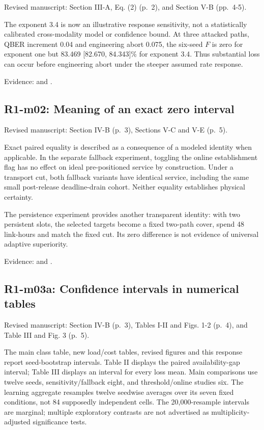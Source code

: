 Revised manuscript: Section III-A, Eq. (2) (p.~2), and Section V-B (pp.~4-5).

The exponent 3.4 is now an illustrative response sensitivity, not a statistically calibrated cross-modality model or confidence bound. At three attacked paths, QBER increment 0.04 and engineering abort 0.075, the six-seed \(F\) is zero for exponent one but 83.469 {[}82.670, 84.343{]}\% for exponent 3.4. Thus substantial loss can occur before engineering abort under the steeper assumed rate response.

Evidence:  and .

\subsection{R1-m02: Meaning of an exact zero interval}\label{r1-m02-meaning-of-an-exact-zero-interval}

Revised manuscript: Section IV-B (p.~3), Sections V-C and V-E (p.~5).

Exact paired equality is described as a consequence of a modeled identity when applicable. In the separate fallback experiment, toggling the online establishment flag has no effect on ideal pre-positioned service by construction. Under a transport cut, both fallback variants have identical service, including the same small post-release deadline-drain cohort. Neither equality establishes physical certainty.

The persistence experiment provides another transparent identity: with two persistent slots, the selected targets become a fixed two-path cover, spend 48 link-hours and match the fixed cut. Its zero difference is not evidence of universal adaptive superiority.

Evidence:  and .

\subsection{R1-m03a: Confidence intervals in numerical tables}\label{r1-m03a-confidence-intervals-in-numerical-tables}

Revised manuscript: Section IV-B (p.~3), Tables I-II and Figs. 1-2 (p.~4), and Table III and Fig. 3 (p.~5).

The main class table, new load/cost tables, revised figures and this response report seed-bootstrap intervals. Table II displays the paired availability-gap interval; Table III displays an interval for every loss mean. Main comparisons use twelve seeds, sensitivity/fallback eight, and threshold/online studies six. The learning aggregate resamples twelve seedwise averages over its seven fixed conditions, not 84 supposedly independent cells. The 20,000-resample intervals are marginal; multiple exploratory contrasts are not advertised as multiplicity-adjusted significance tests.

